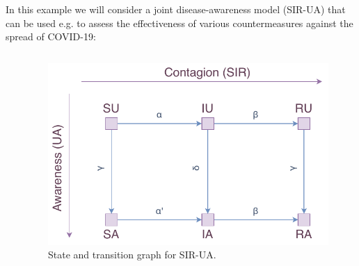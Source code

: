 \documentclass{beamer}
\begin{document}
\begin{frame}{\secname}
    In this example we will consider a joint disease-awareness model (SIR-UA) that can be used e.g.
    to assess the effectiveness of various countermeasures against the spread of COVID-19:
    \begin{columns}[T]
        \captionsetup{font=scriptsize}
        \begin{column}{.5\textwidth}
            \begin{table}
            \centering
            \caption{Transition weights with explanation.}
            \end{table}
        \end{column}
        \begin{column}{0.5\textwidth}
        \begin{figure}
            \centering
            \includegraphics[width=\textwidth]{figures/sir_ua.pdf}
            \caption{State and transition graph for SIR-UA.}
        \end{figure}
        \end{column}
      \end{columns}
\end{frame}
\end{document}
